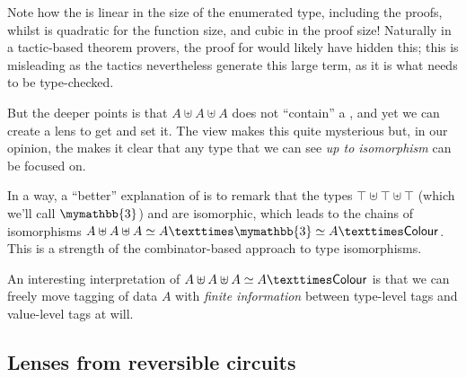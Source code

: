 \documentclass[sigplan,review,anonymous]{acmart}\settopmatter{printfolios=true,printccs=false,printacmref=false}
\begin{document}
Note how the  is linear in the size of the enumerated type, including
the proofs, whilst  is quadratic for the function size, and cubic in
the proof size!  Naturally in a tactic-based theorem provers, the proof for
 would likely have hidden this; this is misleading as the tactics
nevertheless generate this large term, as it is what needs to be type-checked.

But the deeper points is that $A ⊎ A ⊎ A$ does not ``contain'' a ,
and yet we can create a lens to get and set it.  The  view makes this
quite mysterious but, in our opinion, the  makes it clear that any
type that we can see \emph{up to isomorphism} can be focused on.

In a way, a ``better'' explanation of 
is to remark that the types $⊤ ⊎ ⊤ ⊎ ⊤$ (which we'll call
$\mymathbb{3}$) and  are isomorphic, which leads to
the chains of isomorphisms $A \uplus A \uplus A \simeq A × \mymathbb{3}
\simeq A × \AgdaRecord{Colour}$. This is a strength of the combinator-based
approach to type isomorphisms.

An interesting interpretation of $A \uplus A \uplus A \simeq A × \AgdaRecord{Colour}$
is that we can freely move tagging
of data $A$ with \textit{finite information} between type-level tags and value-level
tags at will.

\subsection{Lenses from reversible circuits}
\end{document}
